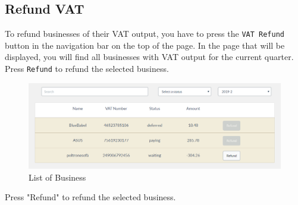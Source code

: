 	\subsection{Refund VAT}
	To refund businesses of their VAT output, you have to press the \texttt{VAT 
	Refund} button in the navigation bar on the top of the page. In the 
	page that will be displayed, you will find all businesses with VAT output for the current quarter.
	Press \texttt{Refund} to refund the selected business.
	\begin{figure}[H]
		\includegraphics[width=15cm]{res/images/business_list.png}
		\centering
		\caption{List of Business}
	\end{figure}
	\noindent Press "Refund" to refund the selected business.\\
